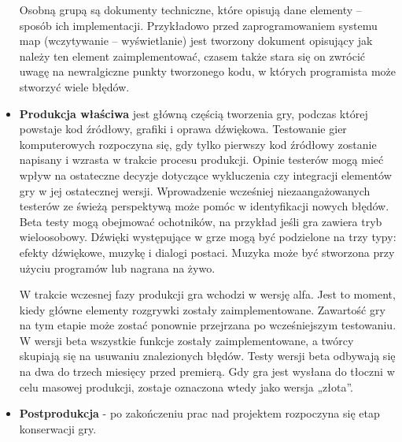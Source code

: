 \begin{itemize}
	Osobną grupą są dokumenty techniczne, które opisują dane elementy – sposób ich implementacji. Przykładowo przed zaprogramowaniem systemu map (wczytywanie – wyświetlanie) jest tworzony dokument opisujący jak należy ten element zaimplementować, czasem także stara się on zwrócić uwagę na newralgiczne punkty tworzonego kodu, w których programista może stworzyć wiele błędów.
	
	\item \textbf{Produkcja właściwa} jest główną częścią tworzenia gry, podczas której powstaje kod źródłowy, grafiki i oprawa dźwiękowa. Testowanie gier komputerowych rozpoczyna się, gdy tylko pierwszy kod źródłowy zostanie napisany i wzrasta w trakcie procesu produkcji. Opinie testerów mogą mieć wpływ na ostateczne decyzje dotyczące wykluczenia czy integracji elementów gry w jej ostatecznej wersji. Wprowadzenie wcześniej niezaangażowanych testerów ze świeżą perspektywą może pomóc w identyfikacji nowych błędów. Beta testy mogą obejmować ochotników, na przykład jeśli gra zawiera tryb wieloosobowy. Dźwięki występujące w grze mogą być podzielone na trzy typy: efekty dźwiękowe, muzykę i dialogi postaci. Muzyka może być stworzona przy użyciu programów lub nagrana na żywo.
	
	W trakcie wczesnej fazy produkcji gra wchodzi w wersję alfa. Jest to moment, kiedy główne elementy rozgrywki zostały zaimplementowane. Zawartość gry na tym etapie może zostać ponownie przejrzana po wcześniejszym testowaniu. W wersji beta wszystkie funkcje zostały zaimplementowane, a twórcy skupiają się na usuwaniu znalezionych błędów. Testy wersji beta odbywają się na dwa do trzech miesięcy przed premierą. Gdy gra jest wysłana do tłoczni w celu masowej produkcji, zostaje oznaczona wtedy jako wersja „złota”.
	
	\item \textbf{Postprodukcja} - po zakończeniu prac nad projektem rozpoczyna się etap konserwacji gry.
\end{itemize}